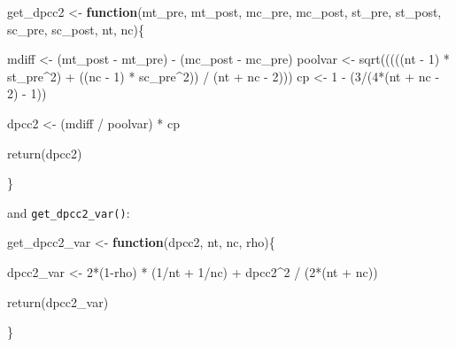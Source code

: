 \documentclass[
]{article}
\newenvironment{Shaded}{\begin{snugshade}}{\end{snugshade}}
\newcommand{\ControlFlowTok}[1]{\textcolor[rgb]{0.13,0.29,0.53}{\textbf{#1}}}
\newcommand{\DecValTok}[1]{\textcolor[rgb]{0.00,0.00,0.81}{#1}}
\newcommand{\FunctionTok}[1]{\textcolor[rgb]{0.00,0.00,0.00}{#1}}
\newcommand{\NormalTok}[1]{#1}
\newcommand{\OtherTok}[1]{\textcolor[rgb]{0.56,0.35,0.01}{#1}}
\newcommand{\SpecialCharTok}[1]{\textcolor[rgb]{0.00,0.00,0.00}{#1}}
\begin{document}
\begin{Shaded}
\begin{Highlighting}[]
\NormalTok{get\_dpcc2 }\OtherTok{\textless{}{-}} \ControlFlowTok{function}\NormalTok{(mt\_pre, mt\_post, mc\_pre, mc\_post,}
\NormalTok{                          st\_pre, st\_post, sc\_pre, sc\_post,}
\NormalTok{                          nt, nc)\{}
    
\NormalTok{    mdiff }\OtherTok{\textless{}{-}}\NormalTok{ (mt\_post }\SpecialCharTok{{-}}\NormalTok{ mt\_pre) }\SpecialCharTok{{-}}\NormalTok{ (mc\_post }\SpecialCharTok{{-}}\NormalTok{ mc\_pre)}
\NormalTok{    poolvar }\OtherTok{\textless{}{-}} \FunctionTok{sqrt}\NormalTok{(((((nt }\SpecialCharTok{{-}} \DecValTok{1}\NormalTok{) }\SpecialCharTok{*}\NormalTok{ st\_pre}\SpecialCharTok{\^{}}\DecValTok{2}\NormalTok{) }\SpecialCharTok{+}\NormalTok{ ((nc }\SpecialCharTok{{-}} \DecValTok{1}\NormalTok{) }\SpecialCharTok{*}\NormalTok{ sc\_pre}\SpecialCharTok{\^{}}\DecValTok{2}\NormalTok{)) }\SpecialCharTok{/}\NormalTok{ (nt }\SpecialCharTok{+}\NormalTok{ nc }\SpecialCharTok{{-}} \DecValTok{2}\NormalTok{)))}
\NormalTok{    cp }\OtherTok{\textless{}{-}} \DecValTok{1} \SpecialCharTok{{-}}\NormalTok{ (}\DecValTok{3}\SpecialCharTok{/}\NormalTok{(}\DecValTok{4}\SpecialCharTok{*}\NormalTok{(nt }\SpecialCharTok{+}\NormalTok{ nc }\SpecialCharTok{{-}} \DecValTok{2}\NormalTok{) }\SpecialCharTok{{-}} \DecValTok{1}\NormalTok{))}
    
\NormalTok{    dpcc2 }\OtherTok{\textless{}{-}}\NormalTok{ (mdiff }\SpecialCharTok{/}\NormalTok{ poolvar) }\SpecialCharTok{*}\NormalTok{ cp}
    
    \FunctionTok{return}\NormalTok{(dpcc2)}
    
\NormalTok{\}}
\end{Highlighting}
\end{Shaded}

and \texttt{get\_dpcc2\_var()}:

\begin{Shaded}
\begin{Highlighting}[]
\NormalTok{get\_dpcc2\_var }\OtherTok{\textless{}{-}} \ControlFlowTok{function}\NormalTok{(dpcc2, nt, nc, rho)\{}
    
\NormalTok{    dpcc2\_var }\OtherTok{\textless{}{-}} \DecValTok{2}\SpecialCharTok{*}\NormalTok{(}\DecValTok{1}\SpecialCharTok{{-}}\NormalTok{rho) }\SpecialCharTok{*}\NormalTok{ (}\DecValTok{1}\SpecialCharTok{/}\NormalTok{nt }\SpecialCharTok{+} \DecValTok{1}\SpecialCharTok{/}\NormalTok{nc) }\SpecialCharTok{+}\NormalTok{ dpcc2}\SpecialCharTok{\^{}}\DecValTok{2} \SpecialCharTok{/}\NormalTok{ (}\DecValTok{2}\SpecialCharTok{*}\NormalTok{(nt }\SpecialCharTok{+}\NormalTok{ nc))}
    
    \FunctionTok{return}\NormalTok{(dpcc2\_var)}
    
\NormalTok{\}}
\end{Highlighting}
\end{Shaded}
\end{document}
